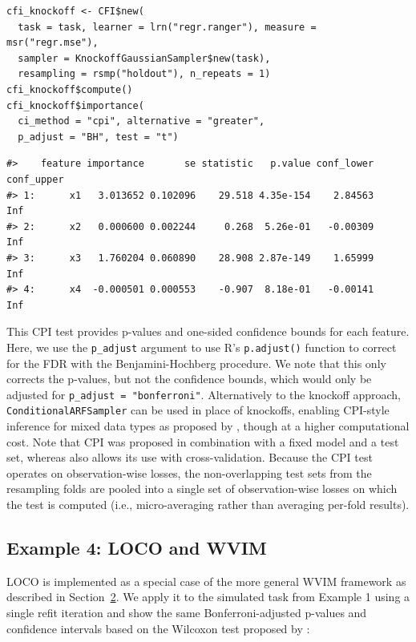 \begin{verbatim}
cfi_knockoff <- CFI$new(
  task = task, learner = lrn("regr.ranger"), measure = msr("regr.mse"),
  sampler = KnockoffGaussianSampler$new(task),
  resampling = rsmp("holdout"), n_repeats = 1)
cfi_knockoff$compute()
cfi_knockoff$importance(
  ci_method = "cpi", alternative = "greater", 
  p_adjust = "BH", test = "t")
\end{verbatim}

\begin{verbatim}
#>    feature importance       se statistic   p.value conf_lower conf_upper
#> 1:      x1   3.013652 0.102096    29.518 4.35e-154    2.84563        Inf
#> 2:      x2   0.000600 0.002244     0.268  5.26e-01   -0.00309        Inf
#> 3:      x3   1.760204 0.060890    28.908 2.87e-149    1.65999        Inf
#> 4:      x4  -0.000501 0.000553    -0.907  8.18e-01   -0.00141        Inf
\end{verbatim}

This CPI test provides p-values and one-sided confidence bounds for each feature.
Here, we use the \texttt{p\_adjust} argument to use R's \texttt{p.adjust()} function to correct for the FDR with the Benjamini-Hochberg procedure.
We note that this only corrects the p-values, but not the confidence bounds, which would only be adjusted for \texttt{p\_adjust\ =\ "bonferroni"}.
Alternatively to the knockoff approach, \texttt{ConditionalARFSampler} can be used in place of knockoffs, enabling CPI-style inference for mixed data types as proposed by \citet{blesch2025conditionalfeaturea}, though at a higher computational cost.
Note that CPI was proposed in combination with a fixed model and a test set, whereas  also allows its use with cross-validation.
Because the CPI test operates on observation-wise losses, the non-overlapping test sets from the resampling folds are pooled into a single set of observation-wise losses on which the test is computed (i.e., micro-averaging rather than averaging per-fold results).

\subsection{Example 4: LOCO and WVIM}\label{example-4-loco-and-wvim}

LOCO is implemented as a special case of the more general WVIM framework as described in Section~\hyperref[sec-fi-methods]{2}.
We apply it to the simulated task from Example 1 using a single refit iteration and show the same Bonferroni-adjusted p-values and confidence intervals based on the Wilcoxon test proposed by \citet{lei2018distributionfreepredictivec}:

